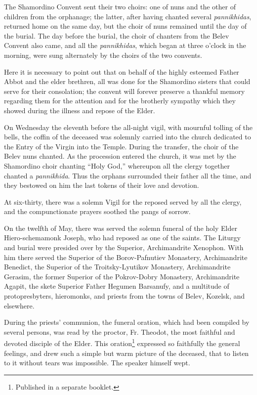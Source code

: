 The Shamordino Convent sent their two choirs: one of nuns and the other of children from the orphanage; the latter, after having chanted several \textit{pannikhidas}, returned home on the same day, but the choir of nuns remained until the day of the burial. The day before the burial, the choir of chanters from the Belev Convent also came, and all the \textit{pannikhidas}, which began at three o'clock in the morning, were sung alternately by the choirs of the two convents.

Here it is necessary to point out that on behalf of the highly esteemed Father Abbot and the elder brethren, all was done for the Shamordino sisters that could serve for their consolation; the convent will forever preserve a thankful memory regarding them for the attention and for the brotherly sympathy which they showed during the illness and repose of the Elder.

On Wednesday the eleventh before the all-night vigil, with mournful tolling of the bells, the coffin of the deceased was solemnly carried into the church dedicated to the Entry of the Virgin into the Temple. During the transfer, the choir of the Belev nuns chanted. As the procession entered the church, it was met by the Shamordino choir chanting ``Holy God,'' whereupon all the clergy together chanted a \textit{pannikhida}. Thus the orphans surrounded their father all the time, and they bestowed on him the last tokens of their love and devotion.

At six-thirty, there was a solemn Vigil for the reposed served by all the clergy, and the compunctionate prayers soothed the pangs of sorrow.

On the twelfth of May, there was served the solemn funeral of the holy Elder Hiero-schemamonk Joseph, who had reposed as one of the saints. The Liturgy and burial were presided over by the Superior, Archimandrite Xenophon. With him there served the Superior of the Borov-Pafnutiev Monastery, Archimandrite Benedict, the Superior of the Troitsky-Lyutikov Monastery, Archimandrite Gerasim, the former Superior of the Pokrov-Dobry Monastery, Archimandrite Agapit, the skete Superior Father Hegumen Barsanufy, and a multitude of protopresbyters, hieromonks, and priests from the towns of Belev, Kozelsk, and elsewhere.

During the priests' communion, the funeral oration, which had been compiled by several persons, was read by the proctor, Fr. Theodot, the most faithful and devoted disciple of the Elder. This oration\footnote{Published in a separate booklet.} expressed so faithfully the general feelings, and drew such a simple but warm picture of the deceased, that to listen to it without tears was impossible. The speaker himself wept.

